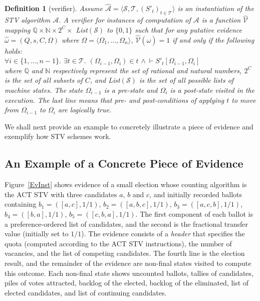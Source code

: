 \documentclass[10pt,conference]{IEEEtran}
\newtheorem{definition}{Definition}
\begin{document}
\begin{definition}[verifier]\label{verifier}
Assume $\hat{\mathcal{A}}= \langle \mathcal{S}, \mathcal{T},
(S'_t)_{t \in \mathcal{T}} \rangle$ is an instantiation of the STV
algorithm $\mathcal{A}$. A \emph{verifier} for instances of
computation of $\mathcal{A}$ is a function $\hat{\mathcal{V}}$
mapping $\mathbb{Q}\times\mathbb{N}\times 2^{C}\times$
\textsf{List}$(\mathcal{S})$ to $\{0,1\}$ such that for any putative evidence $\hat{\omega} = (Q,s,C,\Omega)$ where $\Omega=\langle\Omega_{1},\dots,\Omega_{n}\rangle$, $\hat{\mathcal{V}}(\hat{\omega}) = 1$ if and only if the following holds:\\
$\forall i\in\{1,\dots,n-1\}.$ 
$\exists t\in\mathcal{T}.$  $(\Omega_{i-1},\Omega_{i})\in t$ $\wedge~\vdash S'_{t}[\Omega_{i-1},\Omega_{i}]$\\ 
where $\mathbb{Q}$ and $\mathbb{N}$ respectively represent the set
of rational and natural numbers, $2^{C}$ is the set of all subsets
of $C$, and \textsf{List}$(\mathcal{S})$ is the set of all possible
lists of machine states. The state $\Omega_{i-1}$ is a pre-state and $\Omega_{i}$ is a post-state visited in the execution. The last line means that pre- and post-conditions  of applying $t$ to move from $\Omega_{i-1}$ to $\Omega_{i}$  are logically true. 
\end{definition} 
We shall next provide an example to concretely illustrate a piece of evidence and exemplify how STV schemes work. 
 \subsection{An Example of a Concrete Piece of Evidence}
\label{subsec:InstEv}
Figure~\ref{EvInst} shows evidence of a small election whose counting algorithm is the ACT STV 
with three candidates $a$, $b$ and $c$, and initially recorded ballots containing
$b_1=([a,c],1/1)$, $b_2=([a,b,c],1/1)$, $b_3=([a,c,b],1/1)$,
$b_4=([b,a],1/1)$, $b_5=([c,b,a],1/1)$.  The first component of each ballot is a preference-ordered list of candidates, and the second is the fractional transfer value (initially set to $1/1$). The evidence consists of a \emph{header} that specifies the quota (computed according to the ACT STV instructions), the number of vacancies, and the list of competing candidates. 
The fourth line is the election result, and the remainder of the evidence are non-final states visited to compute this
outcome. Each non-final state shows uncounted ballots, tallies of candidates, piles of votes attracted, backlog of the elected, backlog of the eliminated, list of elected candidates, and list of continuing candidates. 
\end{document}
